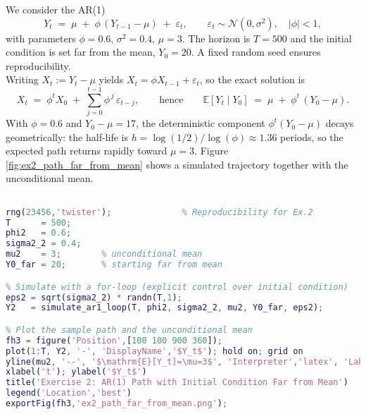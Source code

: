 \documentclass[dvipsnames,11pt]{article}
\begin{document}
    \begin{solution}

        We consider the AR(1)
        \begin{equation}
            Y_t \;=\; \mu \;+\; \phi\,(Y_{t-1}-\mu) \;+\; \varepsilon_t,
            \qquad \varepsilon_t \sim \mathcal{N}(0,\sigma^2),\quad |\phi|<1,
        \end{equation}
        with parameters $\phi=0.6$, $\sigma^2=0.4$, $\mu=3$. The horizon is $T=500$ and the initial condition is set far from the mean, $Y_0=20$. A fixed random seed ensures reproducibility. \\

        Writing $X_t := Y_t-\mu$ yields $X_t=\phi X_{t-1}+\varepsilon_t$, so the exact solution is
        \begin{equation}
            X_t \;=\; \phi^t X_0 \;+\; \sum_{j=0}^{t-1} \phi^{\,j}\,\varepsilon_{t-j},
            \qquad\text{hence}\qquad
            \mathbb{E}[Y_t \mid Y_0] \;=\; \mu \;+\; \phi^t\,(Y_0-\mu).
        \end{equation}
        With $\phi=0.6$ and $Y_0-\mu=17$, the deterministic component $\phi^t(Y_0-\mu)$ decays geometrically: the half-life is
        $h=\log(1/2)/\log(\phi)\approx 1.36$ periods, so the expected path returns rapidly toward $\mu=3$.
        Figure \ref{fig:ex2_path_far_from_mean} shows a simulated trajectory together with the unconditional mean.

\begin{lstlisting}[language=Matlab]
% AR(1) with phi=0.6, sigma^2=0.4, E[Y_t]=3, start Y0=20

rng(23456,'twister');              % Reproducibility for Ex.2
T      = 500;
phi2   = 0.6;
sigma2_2 = 0.4;
mu2    = 3;        % unconditional mean
Y0_far = 20;       % starting far from mean

% Simulate with a for-loop (explicit control over initial condition)
eps2 = sqrt(sigma2_2) * randn(T,1);
Y2   = simulate_ar1_loop(T, phi2, sigma2_2, mu2, Y0_far, eps2);

% Plot the sample path and the unconditional mean
fh3 = figure('Position',[100 100 900 360]);
plot(1:T, Y2, '-', 'DisplayName','$Y_t$'); hold on; grid on
yline(mu2, '--', '$\mathrm{E}[Y_t]=\mu=3$', 'Interpreter','latex', 'LabelVerticalAlignment','bottom', 'DisplayName', '$\mathrm{E}[Y_t]=\mu=3$')
xlabel('t'); ylabel('$Y_t$')
title('Exercise 2: AR(1) Path with Initial Condition Far from Mean')
legend('Location','best')
exportFig(fh3,'ex2_path_far_from_mean.png');
\end{lstlisting}


\end{solution}
\end{document}
